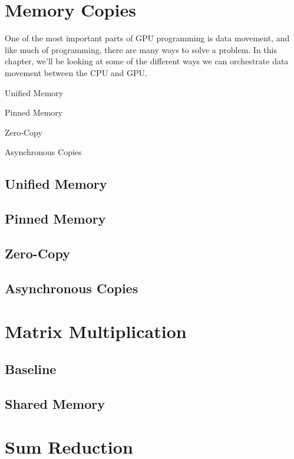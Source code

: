 \documentclass[11pt,fancy,authoryear]{elegantbook}
\begin{document}
\chapter{Memory Copies}

One of the most important parts of GPU programming is data movement, and like much of programming, there are many ways to solve a problem. In this chapter, we'll be looking at some of the different ways we can orchestrate data movement between the CPU and GPU.

\begin{introduction}
  \item Unified Memory
  \item Pinned Memory
  \item Zero-Copy
  \item Asynchronous Copies
\end{introduction}

\section{Unified Memory}

\section{Pinned Memory}

\section{Zero-Copy}

\section{Asynchronous Copies}

\chapter{Matrix Multiplication}

\section{Baseline}

\section{Shared Memory}

\chapter{Sum Reduction}
\end{document}
